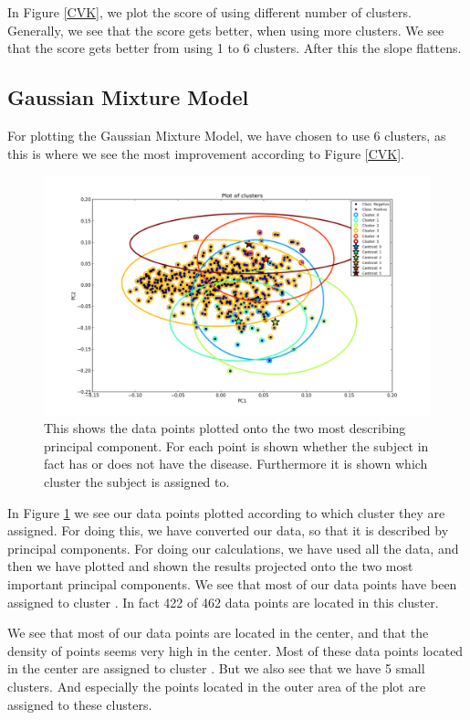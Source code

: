 In Figure \ref{CVK}, we plot the score of using different number of clusters. Generally, we see that the score gets better, when using more clusters. We see that the score gets better from using 1 to 6 clusters. After this the slope flattens.

\subsection{Gaussian Mixture Model}

For plotting the Gaussian Mixture Model, we have chosen to use 6 clusters, as this is where we see the most improvement according to Figure \ref{CVK}.

\begin{figure}[H]
\center
\hspace*{-1.5cm}
\includegraphics[scale=0.4]{pictures/GaussianK6.png}
\caption{\footnotesize This shows the data points plotted onto the two most describing principal component. For each point is shown whether the subject in fact has or does not have the disease. Furthermore it is shown which cluster the subject is assigned to.}
\label{GMM}
\end{figure}

In Figure \ref{GMM} we see our data points plotted according to which cluster they are assigned. For doing this, we have converted our data, so that it is described by principal components. For doing our calculations, we have used all the data, and then we have plotted and shown the results projected onto the two most important principal components. We see that most of our data points have been assigned to cluster \MDC. In fact 422 of 462 data points are located in this cluster.

We see that most of our data points are located in the center, and that the density of points seems very high in the center. Most of these data points located in the center are assigned to cluster \MDC. But we also see that we have 5 small clusters. And especially the points located in the outer area of the plot are assigned to these clusters.

